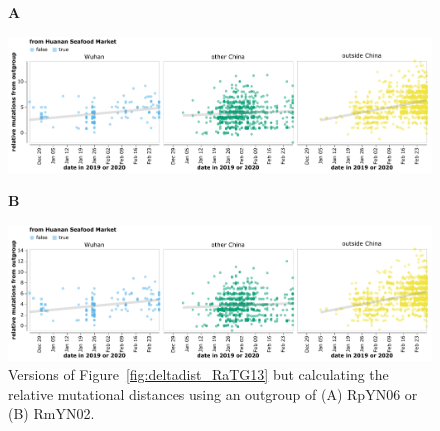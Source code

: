 \documentclass[9pt,twocolumn,twoside]{gsajnl_modified}
\begin{document}
\begin{figure}[h!]
{\bf \LARGE A} \\
\centerline{\includegraphics[width=\linewidth]{figures/deltadist_RpYN06.pdf}}
{\bf \LARGE B} \\
\centerline{\includegraphics[width=\linewidth]{figures/deltadist_RmYN02.pdf}}
\caption{Versions of Figure~\ref{fig:deltadist_RaTG13} but calculating the relative mutational distances using an outgroup of (A) RpYN06 or (B) RmYN02.
}
\label{suppfig:deltadist_RpYN06_RmYN02}
\end{figure}
\end{document}
